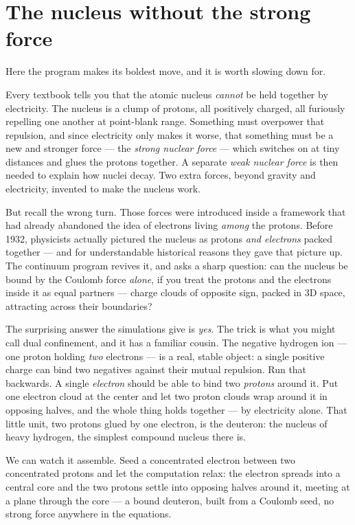 \documentclass[11pt]{article}
\begin{document}
\section*{The nucleus without the strong force}

Here the program makes its boldest move, and it is worth slowing down for.

Every textbook tells you that the atomic nucleus \emph{cannot} be held together by electricity.
The nucleus is a clump of protons, all positively charged, all furiously repelling one another at
point-blank range. Something must overpower that repulsion, and since electricity only makes it
worse, that something must be a new and stronger force --- the \emph{strong nuclear force} ---
which switches on at tiny distances and glues the protons together. A separate \emph{weak nuclear
force} is then needed to explain how nuclei decay. Two extra forces, beyond gravity and
electricity, invented to make the nucleus work.

But recall the wrong turn. Those forces were introduced inside a framework that had already
abandoned the idea of electrons living \emph{among} the protons. Before 1932, physicists actually
pictured the nucleus as protons \emph{and electrons} packed together --- and for understandable
historical reasons they gave that picture up. The continuum program revives it, and asks a sharp
question: can the nucleus be bound by the Coulomb force \emph{alone}, if you treat the protons and
the electrons inside it as equal partners --- charge clouds of opposite sign, packed in 3D space,
attracting across their boundaries?

The surprising answer the simulations give is \emph{yes}. The trick is what you might call dual
confinement, and it has a familiar cousin. The negative hydrogen ion --- one proton holding
\emph{two} electrons --- is a real, stable object: a single positive charge can bind two negatives
against their mutual repulsion. Run that backwards. A single \emph{electron} should be able to bind
two \emph{protons} around it. Put one electron cloud at the center and let two proton clouds wrap
around it in opposing halves, and the whole thing holds together --- by electricity alone. That
little unit, two protons glued by one electron, is the deuteron: the nucleus of heavy hydrogen, the
simplest compound nucleus there is.

We can watch it assemble. Seed a concentrated electron between two concentrated protons and let the
computation relax: the electron spreads into a central core and the two protons settle into
opposing halves around it, meeting at a plane through the core --- a bound deuteron, built from a
Coulomb seed, no strong force anywhere in the equations.
\end{document}
